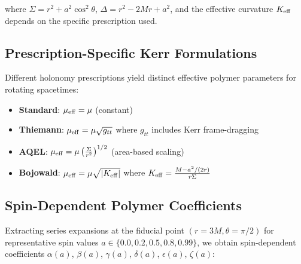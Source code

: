 \documentclass[11pt]{article}
\begin{document}
where $\Sigma = r^2 + a^2\cos^2\theta$, $\Delta = r^2 - 2Mr + a^2$, and the effective curvature $K_{\rm eff}$ depends on the specific prescription used.

\subsection{Prescription-Specific Kerr Formulations}

Different holonomy prescriptions yield distinct effective polymer parameters for rotating spacetimes:

\begin{itemize}
\item \textbf{Standard}: $\mu_{\rm eff} = \mu$ (constant)
\item \textbf{Thiemann}: $\mu_{\rm eff} = \mu \sqrt{g_{tt}}$ where $g_{tt}$ includes Kerr frame-dragging
\item \textbf{AQEL}: $\mu_{\rm eff} = \mu \left(\frac{\Sigma}{r^2}\right)^{1/2}$ (area-based scaling)
\item \textbf{Bojowald}: $\mu_{\rm eff} = \mu \sqrt{|K_{\rm eff}|}$ where $K_{\rm eff} = \frac{M - a^2/(2r)}{r\Sigma}$
\end{itemize}

\subsection{Spin-Dependent Polymer Coefficients}

Extracting series expansions at the fiducial point $(r=3M, \theta=\pi/2)$ for representative spin values $a \in \{0.0, 0.2, 0.5, 0.8, 0.99\}$, we obtain spin-dependent coefficients $\alpha(a)$, $\beta(a)$, $\gamma(a)$, $\delta(a)$, $\epsilon(a)$, $\zeta(a)$:
\end{document}
